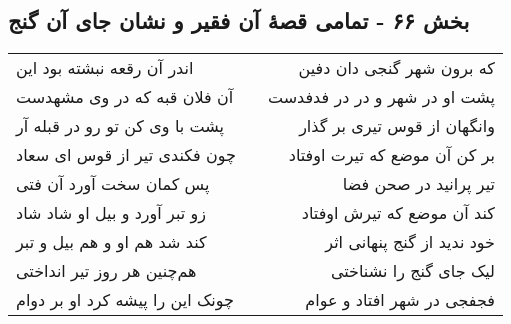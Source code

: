 \begin{center}
\section*{بخش ۶۶ - تمامی قصهٔ آن فقیر و نشان جای آن گنج}
\label{sec:sh066}
\begin{longtable}{l p{0.5cm} r}
اندر آن رقعه نبشته بود این
&&
که برون شهر گنجی دان دفین
\\
آن فلان قبه که در وی مشهدست
&&
پشت او در شهر و در در فدفدست
\\
پشت با وی کن تو رو در قبله آر
&&
وانگهان از قوس تیری بر گذار
\\
چون فکندی تیر از قوس ای سعاد
&&
بر کن آن موضع که تیرت اوفتاد
\\
پس کمان سخت آورد آن فتی
&&
تیر پرانید در صحن فضا
\\
زو تبر آورد و بیل او شاد شاد
&&
کند آن موضع که تیرش اوفتاد
\\
کند شد هم او و هم بیل و تبر
&&
خود ندید از گنج پنهانی اثر
\\
هم‌چنین هر روز تیر انداختی
&&
لیک جای گنج را نشناختی
\\
چونک این را پیشه کرد او بر دوام
&&
فجفجی در شهر افتاد و عوام
\\
\end{longtable}
\end{center}
